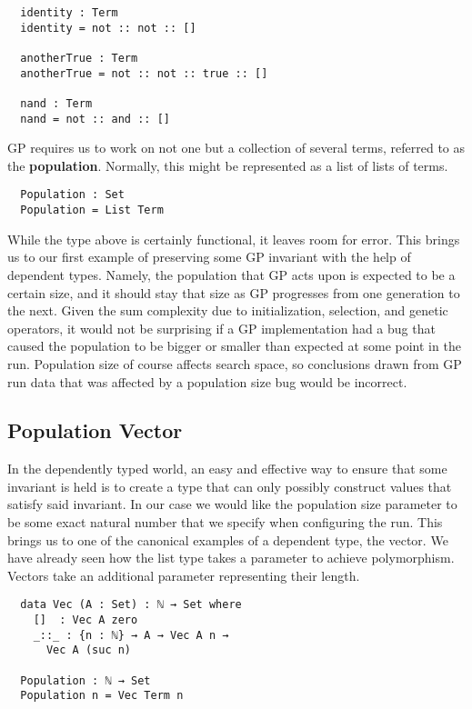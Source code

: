 \documentclass{acm_proc_article-sp}
\begin{document}
\begin{verbatim}
  identity : Term
  identity = not :: not :: []

  anotherTrue : Term
  anotherTrue = not :: not :: true :: []

  nand : Term
  nand = not :: and :: []
\end{verbatim}

GP requires us to work on not one but a collection of several terms,
referred to as the \textbf{population}. Normally, this might be
represented as a list of lists of terms.

\begin{verbatim}
  Population : Set
  Population = List Term
\end{verbatim}

While the type above is certainly functional, it leaves room for
error. This brings us to our first example of preserving some GP
invariant with the help of dependent types. Namely, the population
that GP acts upon is expected to be a certain size, and it should stay
that size as GP progresses from one generation to the next. Given the
sum complexity due to initialization, selection, and genetic
operators, it would not be surprising if a GP implementation had a bug
that caused the population to be bigger or smaller than expected
at some point in the run. Population size of course affects search
space, so conclusions drawn from GP run data that was affected by a
population size bug would be incorrect.

\subsection{Population Vector}

In the dependently typed world, an easy and effective way to ensure
that some invariant is held is to create a type that can only possibly
construct values that satisfy said invariant. In our case we would
like the population size parameter to be some exact natural number
that we specify when configuring the run. This brings us to one of
the canonical examples of a dependent type, the vector. We have
already seen how the list type takes a parameter to achieve
polymorphism. Vectors take an additional parameter representing their
length.

\begin{verbatim}
  data Vec (A : Set) : ℕ → Set where
    []  : Vec A zero
    _::_ : {n : ℕ} → A → Vec A n →
      Vec A (suc n)

  Population : ℕ → Set
  Population n = Vec Term n
\end{verbatim}
\end{document}
